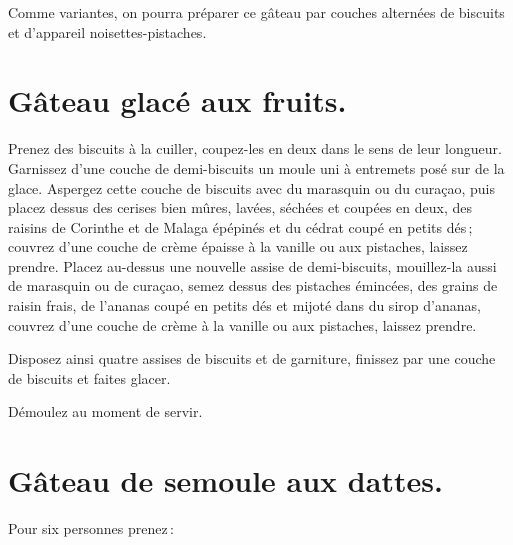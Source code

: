 \sk

Comme variantes, on pourra préparer ce gâteau par couches alternées de biscuits
et d'appareil noisettes-pistaches.

\section*{\centering Gâteau glacé aux fruits.}
{}

Prenez des biscuits à la cuiller, coupez-les en deux dans le sens de leur
longueur. Garnissez d'une couche de demi-biscuits un moule uni à entremets posé
sur de la glace. Aspergez cette couche de biscuits avec du marasquin ou du
curaçao, puis placez dessus des cerises bien mûres, lavées, séchées et coupées
en deux, des raisins de Corinthe et de Malaga épépinés et du cédrat coupé en
petits dés ; couvrez d'une couche de crème épaisse à la vanille ou aux
pistaches, laissez prendre. Placez au-dessus une nouvelle assise de
demi-biscuits, mouillez-la aussi de marasquin ou de curaçao, semez dessus des
pistaches émincées, des grains de raisin frais, de l'ananas coupé en petits dés
et mijoté dans du sirop d’ananas, couvrez d'une couche de crème à la vanille ou
aux pistaches, laissez prendre.

Disposez ainsi quatre assises de biscuits et de garniture, finissez par une
couche de biscuits et faites glacer.

Démoulez au moment de servir.

\section*{\centering Gâteau de semoule aux dattes.}
{}

Pour six personnes prenez :

